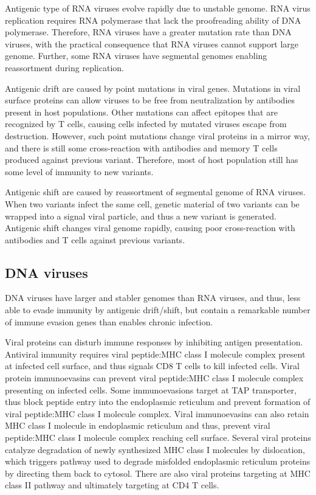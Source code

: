 \documentclass[11pt]{article}
\begin{document}
\begin{sloppypar}
\par

Antigenic type of RNA viruses evolve rapidly due to unstable genome. 
RNA virus replication requires RNA polymerase that lack the proofreading ability of DNA polymerase. 
Therefore, RNA viruses have a greater mutation rate than DNA viruses, with the practical consequence that RNA viruses cannot support large genome. 
Further, some RNA viruses have segmental genomes enabling reassortment during replication. 

\par

Antigenic drift are caused by point mutations in viral genes. 
Mutations in viral surface proteins can allow viruses to be free from neutralization by antibodies present in host populations. 
Other mutations can affect epitopes that are recognized by T cells, causing cells infected by mutated viruses escape from destruction. 
However, such point mutations change viral proteins in a mirror way, and there is still some cross-reaction with antibodies and memory T cells produced against previous variant. 
Therefore, most of host population still has some level of immunity to new variants. 

\par

Antigenic shift are caused by reassortment of segmental genome of RNA viruses. 
When two variants infect the same cell, genetic material of two variants can be wrapped into a signal viral particle, and thus a new variant is generated. 
Antigenic shift changes viral genome rapidly, causing poor cross-reaction with antibodies and T cells against previous variants. 

\subsection{DNA viruses}
DNA viruses have larger and stabler genomes than RNA viruses, and thus, less able to evade immunity by antigenic drift/shift, but contain a remarkable number of immune evasion genes than enables chronic infection. 

\par

Viral proteins can disturb immune responses by inhibiting antigen presentation. 
Antiviral immunity requires viral peptide:MHC class I molecule complex present at infected cell surface, and thus signals CD8 T cells to kill infected cells. 
Viral protein immunoevasins can prevent viral peptide:MHC class I molecule complex presenting on infected cells. 
Some immunoevasions target at TAP transporter, thus block peptide entry into the endoplasmic reticulum and prevent formation of viral peptide:MHC class I molecule complex. 
Viral immunoevasins can also retain MHC class I molecule in endoplasmic reticulum and thus, prevent viral peptide:MHC class I molecule complex reaching cell surface. 
Several viral proteins catalyze degradation of newly synthesized MHC class I molecules by dislocation, which triggers pathway used to degrade misfolded endoplasmic reticulum proteins by directing them back to cytosol. 
There are also viral proteins targeting at MHC class II pathway and ultimately targeting at CD4 T cells. 


\end{sloppypar}
\end{document}
